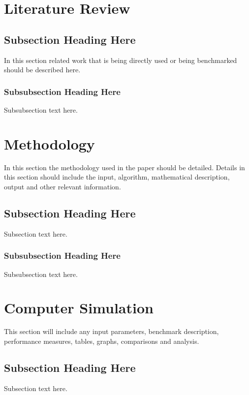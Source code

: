 \documentclass[conference,letterpaper]{IEEEtran}
\begin{document}
%



\section{Literature Review}

\subsection{Subsection Heading Here}
In this section related work that is being directly used or being benchmarked should be described here.

\subsubsection{Subsubsection Heading Here}
Subsubsection text here.



\section{Methodology}

In this section the methodology used in the paper should be detailed. Details in this section should include the input, algorithm, mathematical description, output and other relevant information.

\subsection{Subsection Heading Here}
Subsection text here.

\subsubsection{Subsubsection Heading Here}
Subsubsection text here.



\section{Computer Simulation}

This section will include any input parameters, benchmark description, performance measures, tables, graphs, comparisons and analysis. 

\subsection{Subsection Heading Here}
Subsection text here.
\end{document}
